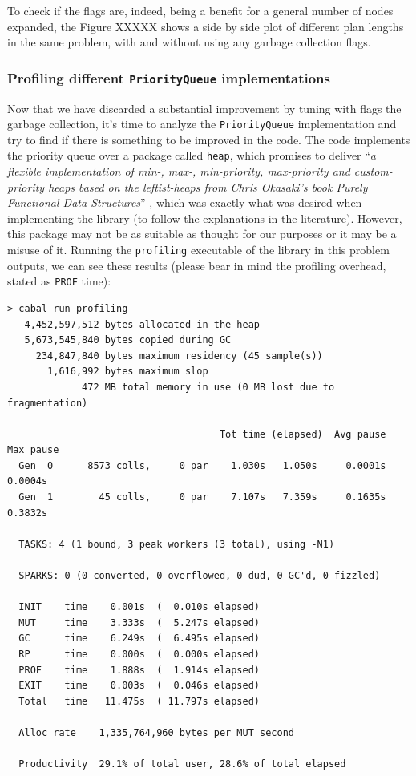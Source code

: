 To check if the flags are, indeed, being a benefit for a general number of
nodes expanded, the Figure XXXXX shows a side by side plot of different plan
lengths in the same problem, with and without using any garbage collection
flags.


\subsubsection{Profiling different \texttt{PriorityQueue} implementations}


Now that we have discarded a substantial improvement by tuning with flags the
garbage collection, it's time to analyze the \texttt{PriorityQueue}
implementation and try to find if there is something to be improved in the
code. The code implements the priority queue over a package called
\texttt{heap}, which promises to deliver ``\textit{a flexible implementation of
  min-, max-, min-priority, max-priority and custom-priority heaps based on the
  leftist-heaps from Chris Okasaki's book Purely Functional Data Structures}''
\cite{okasaki-1999-purely}, which was exactly what was desired when
implementing the library (to follow the explanations in the literature).
However, this package may not be as suitable as thought for our purposes or it
may be a misuse of it. Running the \texttt{profiling} executable of the library
in this problem outputs, we can see these results (please bear in mind the
profiling overhead, stated as \texttt{PROF} time):\\

\begin{lstlisting}
> cabal run profiling
   4,452,597,512 bytes allocated in the heap
   5,673,545,840 bytes copied during GC
     234,847,840 bytes maximum residency (45 sample(s))
       1,616,992 bytes maximum slop
             472 MB total memory in use (0 MB lost due to fragmentation)

                                     Tot time (elapsed)  Avg pause  Max pause
  Gen  0      8573 colls,     0 par    1.030s   1.050s     0.0001s    0.0004s
  Gen  1        45 colls,     0 par    7.107s   7.359s     0.1635s    0.3832s

  TASKS: 4 (1 bound, 3 peak workers (3 total), using -N1)

  SPARKS: 0 (0 converted, 0 overflowed, 0 dud, 0 GC'd, 0 fizzled)

  INIT    time    0.001s  (  0.010s elapsed)
  MUT     time    3.333s  (  5.247s elapsed)
  GC      time    6.249s  (  6.495s elapsed)
  RP      time    0.000s  (  0.000s elapsed)
  PROF    time    1.888s  (  1.914s elapsed)
  EXIT    time    0.003s  (  0.046s elapsed)
  Total   time   11.475s  ( 11.797s elapsed)

  Alloc rate    1,335,764,960 bytes per MUT second

  Productivity  29.1% of total user, 28.6% of total elapsed
\end{lstlisting}


